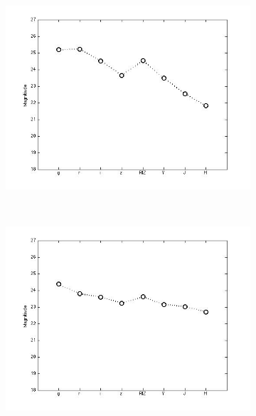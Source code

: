 \documentclass[useAMS,usenatbib,fleqn]{mn2e}
\begin{document}
\begin{figure}
\begin{subfigure}[b]{0.075\textwidth}
                \includegraphics[trim = 35px 15px 50px 25px, clip=true,width=\textwidth]{figures/basis_03.jpg}
        \end{subfigure}
        ~
        \begin{subfigure}[b]{0.075\textwidth}
                \includegraphics[trim = 35px 15px 50px 25px, clip=true,width=\textwidth]{figures/basis_04.jpg}
        \end{subfigure}
        ~
        \begin{subfigure}[b]{0.075\textwidth}

\end{subfigure}
\end{figure}
\end{document}
